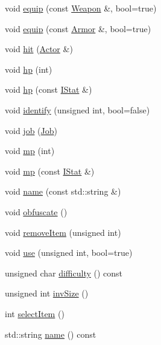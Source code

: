 \begin{DoxyCompactItemize}
void \hyperlink{class_flow_1_1_actor_a2b2c31fc34e8aae951764f80730479e0}{equip} (const \hyperlink{class_flow_1_1_weapon}{Weapon} \&, bool=true)
\item 
void \hyperlink{class_flow_1_1_actor_aa3e3371f1fde52c0dae09ba6f34bb599}{equip} (const \hyperlink{class_flow_1_1_armor}{Armor} \&, bool=true)
\item 
void \hyperlink{class_flow_1_1_actor_a8d41b4076822bd8bc03f44119c7546b0}{hit} (\hyperlink{class_flow_1_1_actor}{Actor} \&)
\item 
void \hyperlink{class_flow_1_1_actor_ab6e6c8f8feb5112cff282769e00f8cc5}{hp} (int)
\item 
void \hyperlink{class_flow_1_1_actor_a26d5b782a05e0b8fc8a5d9b3565b97d8}{hp} (const \hyperlink{class_flow_1_1_i_stat}{I\+Stat} \&)
\item 
void \hyperlink{class_flow_1_1_actor_ae4cb3aadfe983b6bee09b27649dbb704}{identify} (unsigned int, bool=false)
\item 
void \hyperlink{class_flow_1_1_actor_ac107aa0995c0532286dea215ef912cc5}{job} (\hyperlink{namespace_flow_a05bb774db920847e46f3779aaef1b07b}{Job})
\item 
void \hyperlink{class_flow_1_1_actor_aca6243d244b329bed207352fdc3646be}{mp} (int)
\item 
void \hyperlink{class_flow_1_1_actor_a655ad26be9ed06a24653c3413390ac10}{mp} (const \hyperlink{class_flow_1_1_i_stat}{I\+Stat} \&)
\item 
void \hyperlink{class_flow_1_1_actor_ad30420df40d6fec219c9bbac83762b8a}{name} (const std\+::string \&)
\item 
void \hyperlink{class_flow_1_1_actor_aea7ee4b2807325b9c4f9f394fb2c22c1}{obfuscate} ()
\item 
void \hyperlink{class_flow_1_1_actor_a012c1fd5768e2781aab76dea7d29d7c5}{remove\+Item} (unsigned int)
\item 
void \hyperlink{class_flow_1_1_actor_ad6b899f59bde8718624f61159083c74d}{use} (unsigned int, bool=true)
\item 
unsigned char \hyperlink{class_flow_1_1_actor_a2e4ed70c823b510309914f53e26495da}{difficulty} () const
\item 
unsigned int \hyperlink{class_flow_1_1_actor_a6bc972a1ad28bbdb4b30f73779a1f78d}{inv\+Size} ()
\item 
int \hyperlink{class_flow_1_1_actor_a648ab8280efed25bb52cb065199b1dd6}{select\+Item} ()
\item 
std\+::string \hyperlink{class_flow_1_1_actor_a66f88663ad38508b09e53115608dd0f7}{name} () const

\end{DoxyCompactItemize}
